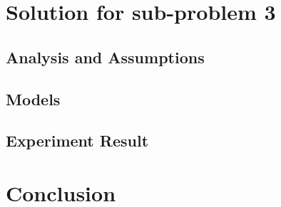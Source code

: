 \section{Solution for sub-problem 3}
\subsection{Analysis and Assumptions}
\subsection{Models}
\subsection{Experiment Result}


\section{Conclusion}
